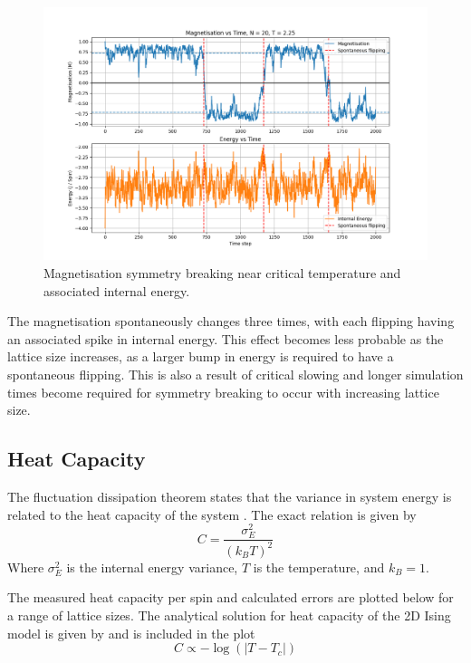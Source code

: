 \documentclass[a4paper, 12pt]{article}
\begin{document}
\begin{figure}[H]
\centering
\includegraphics[width=\textwidth]{./resources/symmetry_breaking.png}
\caption{Magnetisation symmetry breaking near critical temperature and associated internal energy.}
\end{figure}

The magnetisation spontaneously changes three times, with each flipping having an associated spike in internal energy. This effect becomes less probable as the lattice size increases, as a larger bump in energy is required to have a spontaneous flipping. This is also a result of critical slowing and longer simulation times become required for symmetry breaking to occur with increasing lattice size. 


\subsection{Heat Capacity}
The fluctuation dissipation theorem states that the variance in system energy is related to the heat capacity of the system \cite{4}. The exact relation is given by 
\[C = \frac{\sigma_E^2}{(k_B T)^2} \]
Where \( \sigma_E^2 \) is the internal energy variance, \( T \) is the temperature, and \( k_B = 1 \).

The measured heat capacity per spin and calculated errors are plotted below for a range of lattice sizes. The analytical solution for heat capacity of the 2D Ising model is given by \cite{5} and is included in the plot
\[C \propto -\log(|T-T_c|) \]
\end{document}
